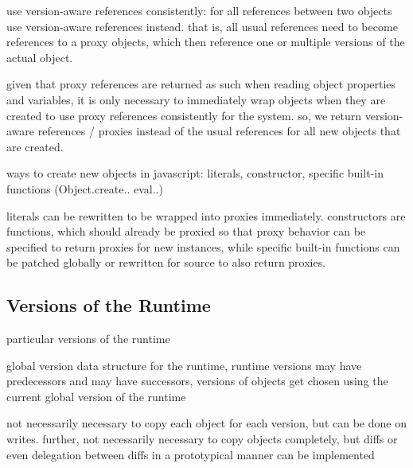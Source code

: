 use version-aware references consistently:
for all references between two objects use version-aware references instead. that is, all usual references need to become references to a proxy objects, which then reference one or multiple versions of the actual object.

given that proxy references are returned as such when reading object properties and variables, it is only necessary to immediately wrap objects when they are created to use proxy references consistently for the system. so, we return version-aware references / proxies instead of the usual references for all new objects that are created.

ways to create new objects in javascript: literals, constructor, specific built-in functions (Object.create.. eval..)

literals can be rewritten to be wrapped into proxies immediately. constructors are functions, which should already be proxied so that proxy behavior can be specified to return proxies for new instances, while specific built-in functions can be patched globally or rewritten for source to also return proxies.



\subsection{Versions of the Runtime}

particular versions of the runtime

global version data structure for the runtime, runtime versions may have predecessors and may have successors, versions of objects get chosen using the current global version of the runtime

not necessarily necessary to copy each object for each version, but can be done on writes. further, not necessarily necessary to copy objects completely, but diffs or even delegation between diffs in a prototypical manner can be implemented
